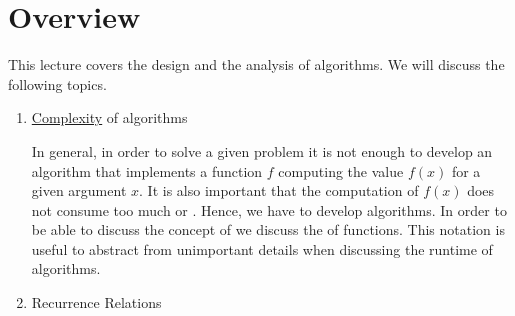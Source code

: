 \section{Overview}
This lecture covers the design and the analysis of algorithms.  We will discuss the following topics.
\begin{enumerate}

\item \href{http://en.wikipedia.org/wiki/Computational_complexity_theory}{Complexity} of algorithms

      In general, in order to solve a given problem it is not enough to develop an algorithm that
      implements a function $f$ computing the  value $f(x)$ for a given argument $x$.  It is also important  
      that the computation of $f(x)$ does not consume too much  or .  Hence, we have
      to develop  algorithms.  In order to be able to discuss the concept of  
      we discuss the  of functions.  This notation is useful to abstract from
      unimportant details when discussing the runtime of algorithms.  
\item Recurrence Relations


\end{enumerate}
